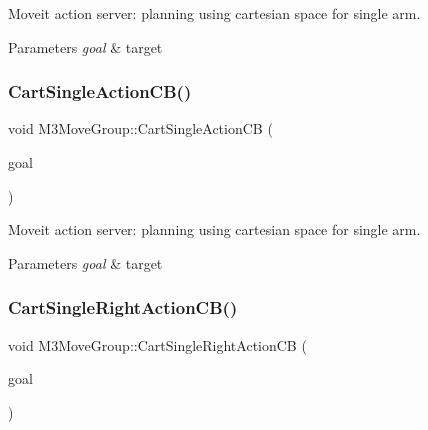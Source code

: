 Moveit action server\+: planning using cartesian space for single arm. 


\begin{DoxyParams}{Parameters}
{\em goal} & target \\
\hline
\end{DoxyParams}
\mbox{\label{classM3MoveGroup_a71fc79c75e8e96881d0cfa6629f5e11d}} 
\subsubsection{\texorpdfstring{Cart\+Single\+Action\+C\+B()}{CartSingleActionCB()}\hspace{0.1cm}{\footnotesize\ttfamily [2/2]}}
{\footnotesize\ttfamily void M3\+Move\+Group\+::\+Cart\+Single\+Action\+CB (\begin{DoxyParamCaption}\item[{const m3\+\_\+moveit\+::\+Moveit\+Single\+Goal\+Const\+Ptr \&}]{goal }\end{DoxyParamCaption})\hspace{0.3cm}{\ttfamily [inline]}}



Moveit action server\+: planning using cartesian space for single arm. 


\begin{DoxyParams}{Parameters}
{\em goal} & target \\
\hline
\end{DoxyParams}
\mbox{\label{classM3MoveGroup_a6ce4ef5d30fc1e93826f4f8104f8db04}} 
\subsubsection{\texorpdfstring{Cart\+Single\+Right\+Action\+C\+B()}{CartSingleRightActionCB()}\hspace{0.1cm}{\footnotesize\ttfamily [1/2]}}
{\footnotesize\ttfamily void M3\+Move\+Group\+::\+Cart\+Single\+Right\+Action\+CB (\begin{DoxyParamCaption}\item[{const m3\+\_\+moveit\+::\+Moveit\+Single\+Goal\+Const\+Ptr \&}]{goal }\end{DoxyParamCaption})\hspace{0.3cm}{\ttfamily [inline]}}



